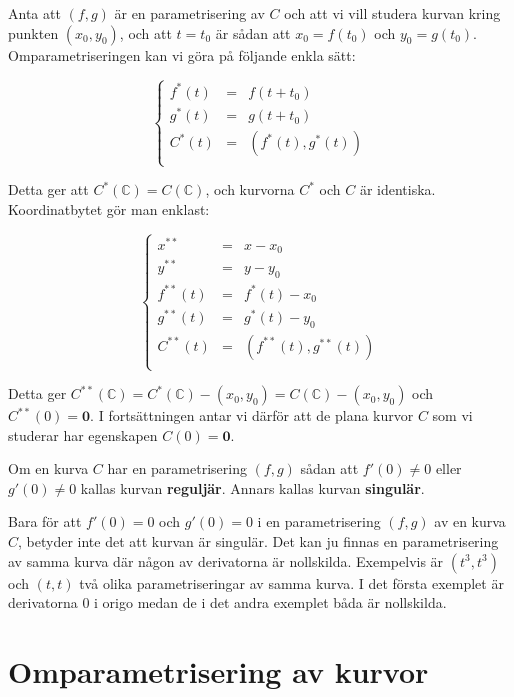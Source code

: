 Anta att $(f, g)$ är en parametrisering av $C$ och att vi vill studera kurvan
kring punkten $\left(x_0, y_0\right)$, och att $t = t_0$ är sådan att $x_0 = f(t_0)$ och $y_0 = g(t_0)$. Omparametriseringen kan vi göra på följande enkla sätt:

\begin{equation*}
\left\{
\begin{array}{lll}
f^*(t) & = & f(t+t_0) \\
g^*(t) & = & g(t+t_0) \\
C^*(t) & = & (f^*(t),g^*(t)) \\
\end{array}
\right.
\end{equation*}

Detta ger att $C^*(\mathbb{C}) = C(\mathbb{C})$, och kurvorna $C^*$ och $C$ är identiska. Koordinatbytet gör man enklast:

\begin{equation*}
\left\{
\begin{array}{lll}
x^{**} & = & x-x_0 \\
y^{**} & = & y-y_0 \\
f^{**}(t) & = & f^*(t)-x_0 \\
g^{**}(t) & = & g^*(t)-y_0 \\
C^{**}(t) & = & (f^{**}(t),g^{**}(t)) \\
\end{array}
\right.
\end{equation*}

Detta ger $C^{**}(\mathbb{C}) = C^*(\mathbb{C}) - (x_0, y_0) = C(\mathbb{C}) - (x_0, y_0)$ och $C^{**}(0) = \mathbf{0}$. I fortsättningen antar vi därför att de plana kurvor $C$ som vi studerar har egenskapen $C(0) = \mathbf{0}$.


\begin{Definition}
Om en kurva $C$ har en parametrisering $(f, g)$ sådan att $f'(0) \neq 0$ eller $g'(0) \neq 0$ kallas kurvan \textbf{reguljär}. Annars kallas kurvan \textbf{singulär}.
\end{Definition}

Bara för att $f'(0) = 0$ och $g'(0) = 0$ i en parametrisering $(f, g)$ av en kurva $C$, betyder inte det att kurvan är singulär. Det kan ju finnas en parametrisering av samma kurva där någon av derivatorna är nollskilda. Exempelvis är $(t^3, t^3)$ och $(t, t)$ två olika parametriseringar av samma kurva. I det första exemplet är derivatorna $0$ i origo medan de i det andra exemplet båda är nollskilda.

\section{Omparametrisering av kurvor}

